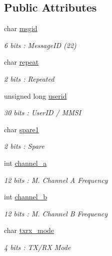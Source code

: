 \subsection*{Public Attributes}
\begin{DoxyCompactItemize}
\item 
char \mbox{\hyperlink{structaismsg__22_a64c77ae59ef591a33fda4edbe63717d7}{msgid}}
\begin{DoxyCompactList}\small\item\em 6 bits \+: Message\+ID (22) \end{DoxyCompactList}\item 
char \mbox{\hyperlink{structaismsg__22_abc92f086212c12847c62e40ad400175c}{repeat}}
\begin{DoxyCompactList}\small\item\em 2 bits \+: Repeated \end{DoxyCompactList}\item 
unsigned long \mbox{\hyperlink{structaismsg__22_a171e90386762b51830a5c27f1c8df835}{userid}}
\begin{DoxyCompactList}\small\item\em 30 bits \+: User\+ID / M\+M\+SI \end{DoxyCompactList}\item 
char \mbox{\hyperlink{structaismsg__22_af4cd0dc6b79dbecd8695df8cd5c21b66}{spare1}}
\begin{DoxyCompactList}\small\item\em 2 bits \+: Spare \end{DoxyCompactList}\item 
int \mbox{\hyperlink{structaismsg__22_a3a01a92788c47ccb58e4d1d479c5bc48}{channel\+\_\+a}}
\begin{DoxyCompactList}\small\item\em 12 bits \+: M. Channel A Frequency \end{DoxyCompactList}\item 
int \mbox{\hyperlink{structaismsg__22_a740a96027a0a786dcd7928da3d150118}{channel\+\_\+b}}
\begin{DoxyCompactList}\small\item\em 12 bits \+: M. Channel B Frequency \end{DoxyCompactList}\item 
char \mbox{\hyperlink{structaismsg__22_ad2030bfc2c9066e52a3ea201ef530949}{txrx\+\_\+mode}}
\begin{DoxyCompactList}\small\item\em 4 bits \+: T\+X/\+RX Mode \end{DoxyCompactList}\item 

\end{DoxyCompactItemize}
